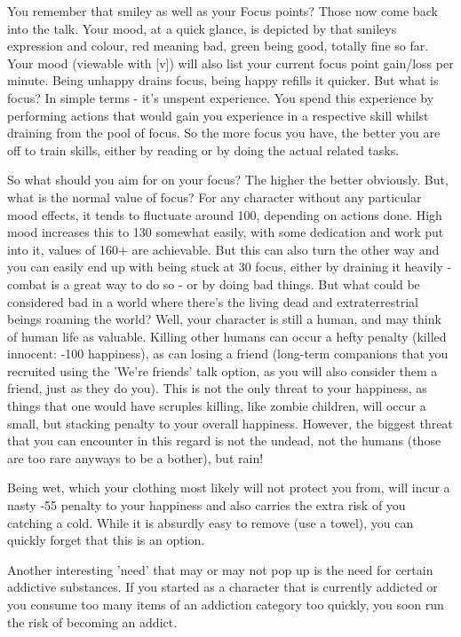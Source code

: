 You remember that smiley as well as your Focus points? Those now come back into the talk. Your mood, at a quick glance, is depicted by that smileys expression and colour, red meaning bad, green being good, totally fine so far. Your mood (viewable with [v]) will also list your current focus point gain/loss per minute. Being unhappy drains focus, being happy refills it quicker. But what is focus? In simple terms - it's unspent experience. You spend this experience by performing actions that would gain you experience in a respective skill whilst draining from the pool of focus. So the more focus you have, the better you are off to train skills, either by reading or by doing the actual related tasks.

So what should you aim for on your focus? The higher the better obviously. But, what is the normal value of focus? For any character without any particular mood effects, it tends to fluctuate around 100, depending on actions done. High mood increases this to 130 somewhat easily, with some dedication and work put into it, values of 160+ are achievable. But this can also turn the other way and you can easily end up with being stuck at 30 focus, either by draining it heavily - combat is a great way to do so - or by doing bad things. But what could be considered bad in a world where there's the living dead and extraterrestrial beings roaming the world? Well, your character is still a human, and may think of human life as valuable. Killing other humans can occur a hefty penalty (killed innocent: -100 happiness), as can losing a friend (long-term companions that you recruited using the 'We're friends' talk option, as you will also consider them a friend, just as they do you). This is not the only threat to your happiness, as things that one would have scruples killing, like zombie children, will occur a small, but stacking penalty to your overall happiness. However, the biggest threat that you can encounter in this regard is not the undead, not the humans (those are too rare anyways to be a bother), but rain!

Being wet, which your clothing most likely will not protect you from, will incur a nasty -55 penalty to your happiness and also carries the extra risk of you catching a cold. While it is absurdly easy to remove (use a towel), you can quickly forget that this is an option.

Another interesting 'need' that may or may not pop up is the need for certain addictive substances. If you started as a character that is currently addicted or you consume too many items of an addiction category too quickly, you soon run the risk of becoming an addict.

